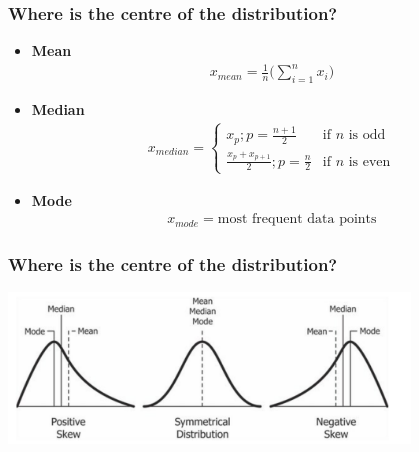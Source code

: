 \documentclass{beamer}
\begin{document}
    \begin{frame}
        \frametitle{Where is the centre of the distribution?}
        \begin{itemize}
            \item \textbf{Mean}
            \begin{align*}
                x_{mean} = \frac{1}{n}\bigg(\sum_{i=1}^{n}x_{i}\bigg)
            \end{align*}
            \item \textbf{Median}
            \begin{align*}
                x_{median} = 
                \begin{cases}
                    x_{p}; p = \frac{n+1}{2} & \text{if $n$ is odd}\\
                    \frac{x_{p} + x_{p+1}}{2}; p = \frac{n}{2} & \text{if $n$ is even}
                \end{cases}
            \end{align*}
            \item \textbf{Mode}
            \begin{align*}
                x_{mode} = \text{most frequent data points}
            \end{align*}
        \end{itemize}
    \end{frame}
    \begin{frame}
        \frametitle{Where is the centre of the distribution?}
        \begin{center}
            \includegraphics[width=0.8\textwidth]{figures/mmm.png}
        \end{center}
    \end{frame}
\end{document}
